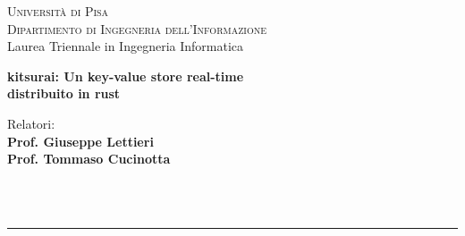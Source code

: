 \begin{titlepage}
    \begin{center}
        \LARGE{\textsc{Università di Pisa}} \\
        \vspace{6pt}
        \Large{\textsc{Dipartimento di Ingegneria dell'Informazione}} \\
        \vspace{6pt}
        \LARGE{Laurea Triennale in Ingegneria Informatica}
    \end{center}
    \vspace{15mm}
    \begin{center}
        \LARGE{\textbf{
            kitsurai: Un key-value store real-time \\
            \vspace{2mm}
            distribuito in rust
        }}
    \end{center}
    \vspace{30mm}
    \begin{minipage}[t]{0.47\textwidth}
    {
        \large{
            Relatori: \\
            \textbf{Prof. Giuseppe Lettieri} \\
            \textbf{Prof. Tommaso Cucinotta} \\
        }
    }
    \end{minipage}
    \hfill
    \begin{minipage}[t]{0.47\textwidth}
    \end{minipage} \\
    \vspace{4cm} \\
    \hrule
    \vspace{6pt}
\end{titlepage}
\restoregeometry
